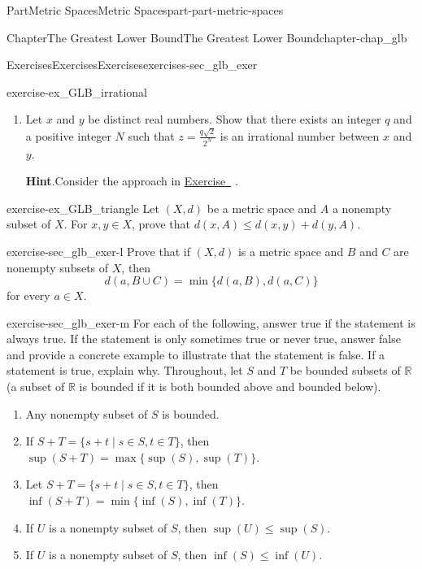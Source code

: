 \documentclass[oneside,10pt,]{book}
\newcommand{\blocktitlefont}{\relax}
\newcommand{\xreffont}{\relax}
\numberwithin{equation}{chapter}
\newcommand{\R}{\mathbb{R}}
\begin{document}
\begin{partptx}{Part}{Metric Spaces}{}{Metric Spaces}{}{}{part-part-metric-spaces}
\begin{chapterptx}{Chapter}{The Greatest Lower Bound}{}{The Greatest Lower Bound}{}{}{chapter-chap_glb}
\begin{exercises-section}{Exercises}{Exercises}{}{Exercises}{}{}{exercises-sec_glb_exer}
\begin{divisionexercise}{10}{}{}{exercise-ex_GLB_irrational}
\begin{enumerate}[font=\bfseries,label=(\alph*),ref=\alph*]
\begin{enumerate}[font=\bfseries,label=(\roman*),ref=\theenumi.\roman*]
\end{enumerate}%
\item{}Let \(x\) and \(y\) be distinct real numbers. Show that there exists an integer \(q\) and a positive integer \(N\) such that \(z=\frac{q\sqrt{2}}{2^N}\) is an irrational number between \(x\) and \(y\).%
\par\smallskip%
\noindent\textbf{\blocktitlefont Hint}.\hypertarget{hint-ex_GLB_irrational-c-b}{}\quad{}Consider the approach in \hyperlink{exercise-ex_GLB_rational}{Exercise~{\xreffont 7}} .%
\end{enumerate}%
\end{divisionexercise}%
\begin{divisionexercise}{11}{}{}{exercise-ex_GLB_triangle}%
Let \((X,d)\) be a metric space and \(A\) a nonempty subset of \(X\). For \(x,y \in X\), prove that \(d(x,A) \leq d(x,y) + d(y,A)\).%
\end{divisionexercise}%
\begin{divisionexercise}{12}{}{}{exercise-sec_glb_exer-l}%
Prove that if \((X,d)\) is a metric space and \(B\) and \(C\) are nonempty subsets of \(X\), then%
\begin{equation*}
d(a, B \cup C) = \min\{d(a,B), d(a,C)\}
\end{equation*}
for every \(a \in X\).%
\end{divisionexercise}%
\begin{divisionexercise}{13}{}{}{exercise-sec_glb_exer-m}%
For each of the following, answer true if the statement is always true. If the statement is only sometimes true or never true, answer false and provide a concrete example to illustrate that the statement is false. If a statement is true, explain why. Throughout, let \(S\) and \(T\) be bounded subsets of \(\R\) (a subset of \(\R\) is bounded if it is both bounded above and bounded below).%
\begin{enumerate}[font=\bfseries,label=(\alph*),ref=\alph*]%
\item{}Any nonempty subset of \(S\) is bounded.%
\item{}If \(S + T = \{s+t \mid s \in S, t \in T\}\), then \(\sup(S + T) = \max\{\sup(S), \sup(T)\}\).%
\item{}Let \(S + T = \{s+t \mid s \in S, t \in T\}\), then \(\inf(S + T) = \min\{\inf(S), \inf(T)\}\).%
\item{}If \(U\) is a nonempty subset of \(S\), then \(\sup(U) \leq \sup(S)\).%
\item{}If \(U\) is a nonempty subset of \(S\), then \(\inf(S) \leq \inf(U)\).%

\end{enumerate}
\end{divisionexercise}
\end{exercises-section}
\end{chapterptx}
\end{partptx}
\end{document}
